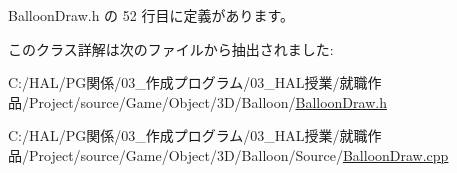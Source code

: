  Balloon\+Draw.\+h の 52 行目に定義があります。



このクラス詳解は次のファイルから抽出されました\+:\begin{DoxyCompactItemize}
\item 
C\+:/\+H\+A\+L/\+P\+G関係/03\+\_\+作成プログラム/03\+\_\+\+H\+A\+L授業/就職作品/\+Project/source/\+Game/\+Object/3\+D/\+Balloon/\mbox{\hyperlink{_balloon_draw_8h}{Balloon\+Draw.\+h}}\item 
C\+:/\+H\+A\+L/\+P\+G関係/03\+\_\+作成プログラム/03\+\_\+\+H\+A\+L授業/就職作品/\+Project/source/\+Game/\+Object/3\+D/\+Balloon/\+Source/\mbox{\hyperlink{_balloon_draw_8cpp}{Balloon\+Draw.\+cpp}}\end{DoxyCompactItemize}
